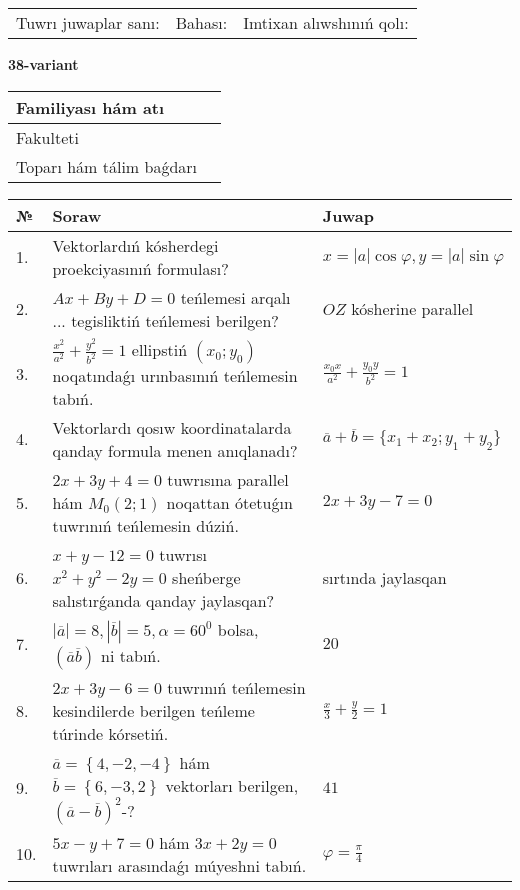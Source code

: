\documentclass{article}
\begin{document}
\vspace{1cm}

\begin{tabular}{lll}
Tuwrı juwaplar sanı: \underline{\hspace{1.5cm}} & 
Bahası: \underline{\hspace{1.5cm}} & 
Imtixan alıwshınıń qolı: \underline{\hspace{2cm}} \\
\end{tabular}

\egroup

\newpage


\textbf{38-variant}\\

\bgroup
\def\arraystretch{1.6} %

\begin{tabular}{|m{5.7cm}|m{9.5cm}|}
\hline
Familiyası hám atı & \\
\hline
Fakulteti  & \\
\hline
Toparı hám tálim baǵdarı  & \\
\hline
\end{tabular}

\vspace{1cm}

\begin{tabular}{|m{0.7cm}|m{10cm}|m{4cm}|}
\hline
№ & Soraw & Juwap \\
\hline
1. & Vektorlardıń kósherdegi proekciyasınıń formulası? & $x=|a|\cos\varphi, y=|a|\sin\varphi$ \\
\hline
2. & $Ax+By+D=0$ teńlemesi arqalı ... tegisliktiń teńlemesi berilgen? & $OZ$ kósherine parallel \\
\hline
3. & $\frac{x^2}{a^2}+\frac{y^2}{b^2}=1$ ellipstiń $(x_0;y_0)$ noqatındaǵı urınbasınıń teńlemesin tabıń. & $\frac{x_0x}{a^2}+\frac{y_0y}{b^2}=1$ \\
\hline
4. & Vektorlardı qosıw koordinatalarda qanday formula menen anıqlanadı? & $\overline{a}+\overline{b}=\{x_1+x_2;y_1+y_2\}$ \\
\hline
5. & $2x+3y+4=0$ tuwrısına parallel hám $M_{0} (2;1)$ noqattan ótetuǵın tuwrınıń teńlemesin dúziń. & $2x+3y-7=0$ \\
\hline
6. & $x+y-12=0$ tuwrısı $x^{2}+y^{2}-2y=0$ sheńberge salıstırǵanda qanday jaylasqan? & sırtında jaylasqan \\
\hline
7. & $\left| \overline{a} \right|=8, \left| \overline{b} \right|=5, \alpha=60^{0}$ bolsa, $( \overline{a}\overline{b} )$ ni tabıń. & $20$ \\
\hline
8. & $2x+3y-6=0$ tuwrınıń teńlemesin kesindilerde berilgen teńleme túrinde kórsetiń. & $\frac{x}{3} + \frac{ y }{ 2 } =  1$ \\
\hline
9. & $\overline{a}=\left\{ 4,-2,-4 \right\}$ hám $\overline{b}=\left\{ 6,-3, 2 \right\}$ vektorları berilgen, $(\overline{a}-\overline{b}) ^{2}$-? & $41$ \\
\hline
10. & $5x-y+7=0$ hám $3x+2y=0$ tuwrıları arasındaǵı múyeshni tabıń. & $\varphi=\frac{\pi}{4}$ \\
\hline
\end{tabular}
\end{document}
